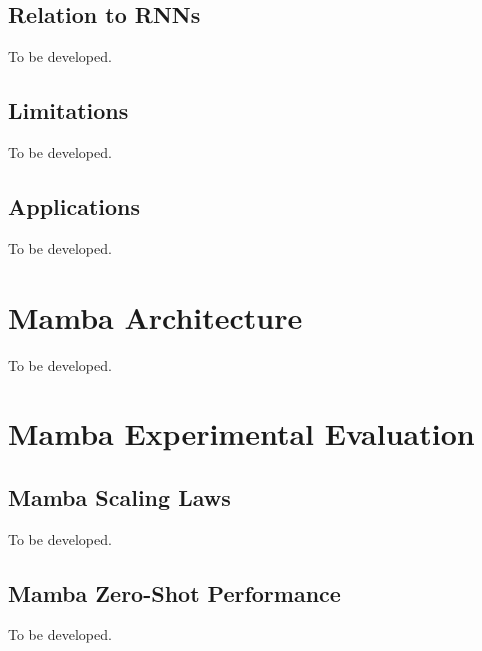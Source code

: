 \documentclass[11pt, oneside]{book}
\let\originalsection\section
\renewcommand{\section}{\Needspace{7\baselineskip}\originalsection}
\let\originalsubsection\subsection
\renewcommand{\subsection}{\Needspace{6\baselineskip}\originalsubsection}
\begin{document}
\subsection{Relation to RNNs}\label{sec:source-7-1-6}
{\small\color{gray!70!black} To be developed.}

\subsection{Limitations}\label{sec:source-7-1-7}
{\small\color{gray!70!black} To be developed.}

\subsection{Applications}\label{sec:source-7-1-8}
{\small\color{gray!70!black} To be developed.}

\section{Mamba Architecture}\label{sec:source-7-2}
{\small\color{gray!70!black} To be developed.}

\section{Mamba Experimental Evaluation}\label{sec:source-7-3}

\subsection{Mamba Scaling Laws}\label{sec:source-7-3-1}
{\small\color{gray!70!black} To be developed.}

\subsection{Mamba Zero-Shot Performance}\label{sec:source-7-3-2}
{\small\color{gray!70!black} To be developed.}
\end{document}
